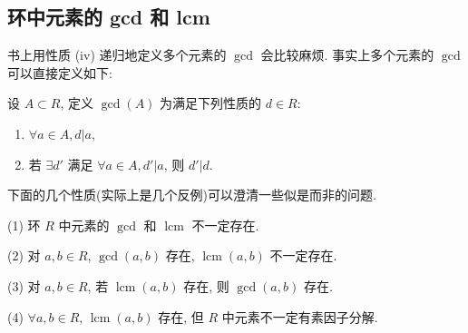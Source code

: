 \documentclass[UTF8]{ctexart}
\begin{document}
\subsection{环中元素的 gcd 和 lcm}
书上用性质 (iv) 递归地定义多个元素的 $\gcd$ 会比较麻烦. 事实上多个元素的 $\gcd$ 可以直接定义如下:
\begin{definition}
    设 $A\subset R$, 定义 $\gcd(A)$ 为满足下列性质的 $d\in R$:
    \begin{enumerate}
        \item $\forall a\in A,d|a$,
        \item 若 $\exists d'$ 满足 $\forall a\in A,d'|a$, 则 $d'|d$.
    \end{enumerate}
\end{definition}
下面的几个性质(实际上是几个反例)可以澄清一些似是而非的问题.
\begin{property}
    (1) 环 $R$ 中元素的 $\gcd$ 和 $\operatorname{lcm}$ 不一定存在.

    (2) 对 $a,b\in R$, $\gcd(a,b)$ 存在, $\operatorname{lcm}(a,b)$ 不一定存在.

    (3) 对 $a,b\in R$, 若 $\operatorname{lcm}(a,b)$ 存在, 则 $\gcd(a,b)$ 存在.

    (4) $\forall a,b\in R$, $\operatorname{lcm}(a,b)$ 存在, 但 $R$ 中元素不一定有素因子分解.
\end{property}
\end{document}
